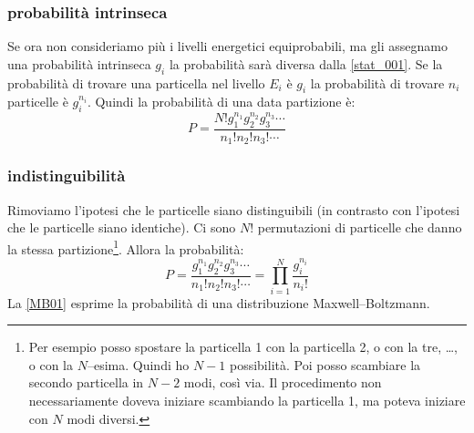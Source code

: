 \subsubsection{probabilità intrinseca}
Se ora non consideriamo più i livelli energetici equiprobabili, ma gli assegnamo una probabilità intrinseca $g_i$ la probabilità sarà diversa dalla \eqref{stat_001}. Se la probabilità di trovare una particella nel livello $E_i$ è $g_i$ la probabilità di trovare $n_i$ particelle è $g_i^{n_i}$. Quindi la probabilità di una data partizione è:
\begin{equation}
P=\frac{N!g_1^{n_1}g_2^{n_2}g_3^{n_3}\cdots}{n_1!n_2!n_3!\cdots}
\end{equation}
\subsubsection{indistinguibilità}
Rimoviamo l'ipotesi che le particelle siano distinguibili (in contrasto con l'ipotesi che le particelle siano identiche). Ci sono $N!$ permutazioni di particelle che danno la stessa partizione\footnote{Per esempio posso spostare la particella 1 con la particella 2, o con la tre, \ldots, o con la $N$--esima. Quindi ho $N-1$ possibilità. Poi posso scambiare la secondo particella in $N-2$ modi, così via. Il procedimento non necessariamente doveva iniziare scambiando la particella 1, ma poteva iniziare con $N$ modi diversi.}. Allora la probabilità:
\begin{equation}
P=\frac{g_1^{n_1}g_2^{n_2}g_3^{n_3}\cdots}{n_1!n_2!n_3!\cdots}=\prod_{i=1}^N\frac{g_i^{n_i}}{n_i!}
\label{MB01}
\end{equation}
La \eqref{MB01} esprime la probabilità di una distribuzione Maxwell--Boltzmann.

